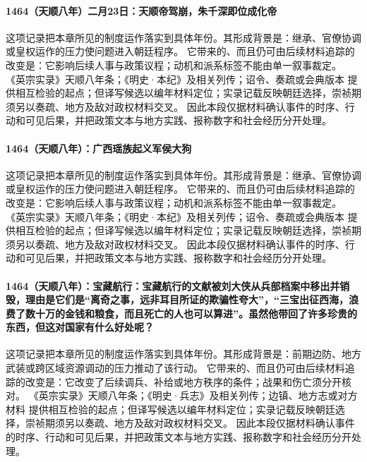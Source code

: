 \paragraph{1464（天顺八年）二月23日：天顺帝驾崩，朱千深即位成化帝} 这项记录把本章所见的制度运作落实到具体年份。其形成背景是：继承、官僚协调或皇权运作的压力使问题进入朝廷程序。 它带来的、而且仍可由后续材料追踪的改变是：它影响后续人事与政策议程；动机和派系标签不能由单一叙事裁定。 《英宗实录》天顺八年条；《明史·本纪》及相关列传；诏令、奏疏或会典版本 提供相互检验的起点；但译写候选以编年材料定位；实录记载反映朝廷选择，崇祯期须另以奏疏、地方及敌对政权材料交叉。 因此本段仅据材料确认事件的时序、行动和可见后果，并把政策文本与地方实践、报称数字和社会经历分开处理。

\paragraph{1464（天顺八年）：广西瑶族起义军侯大狗} 这项记录把本章所见的制度运作落实到具体年份。其形成背景是：继承、官僚协调或皇权运作的压力使问题进入朝廷程序。 它带来的、而且仍可由后续材料追踪的改变是：它影响后续人事与政策议程；动机和派系标签不能由单一叙事裁定。 《英宗实录》天顺八年条；《明史·本纪》及相关列传；诏令、奏疏或会典版本 提供相互检验的起点；但译写候选以编年材料定位；实录记载反映朝廷选择，崇祯期须另以奏疏、地方及敌对政权材料交叉。 因此本段仅据材料确认事件的时序、行动和可见后果，并把政策文本与地方实践、报称数字和社会经历分开处理。

\paragraph{1464（天顺八年）：宝藏航行：宝藏航行的文献被刘大侠从兵部档案中移出并销毁，理由是它们是“离奇之事，远非耳目所证的欺骗性夸大”，“三宝出征西海，浪费了数十万的金钱和粮食，而且死亡的人也可以算进”。虽然他带回了许多珍贵的东西，但这对国家有什么好处呢？} 这项记录把本章所见的制度运作落实到具体年份。其形成背景是：前期边防、地方武装或跨区域资源调动的压力推动了该行动。 它带来的、而且仍可由后续材料追踪的改变是：它改变了后续调兵、补给或地方秩序的条件；战果和伤亡须分开核对。 《英宗实录》天顺八年条；《明史·兵志》及相关列传；边镇、地方志或对方材料 提供相互检验的起点；但译写候选以编年材料定位；实录记载反映朝廷选择，崇祯期须另以奏疏、地方及敌对政权材料交叉。 因此本段仅据材料确认事件的时序、行动和可见后果，并把政策文本与地方实践、报称数字和社会经历分开处理。
